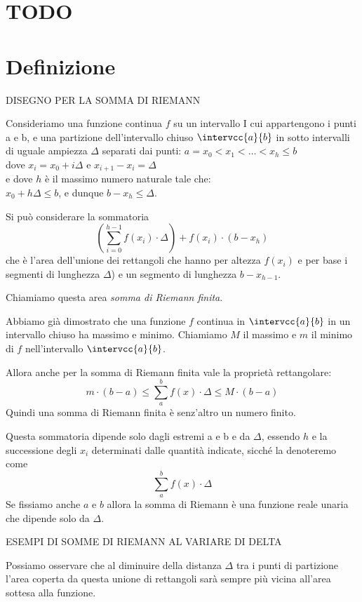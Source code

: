 \section{TODO}

\section{Definizione}
\label{sec:integrali_definizione}

DISEGNO PER LA SOMMA DI RIEMANN %

Consideriamo una funzione continua \(f\) su un intervallo I cui appartengono 
i punti a e b, e una partizione dell'intervallo chiuso \(\intervcc{a}{b}\) in 
sotto intervalli di uguale ampiezza \(\Delta\) 
separati dai punti: 
\(a = x_0 < x_1 < \dots < x_h \le b\) \\
dove \(x_i = x_0 +i \Delta\) e \(x_{i+1} - x_i= \Delta\) \\
e dove \(h\) è il massimo numero naturale tale che: \\
\(x_0 + h \Delta \le b\), e dunque \(b-x_h \le \Delta\).

Si può considerare la sommatoria
\[\left(\sum_{i=0}^{h-1} f(x_i)\cdot\Delta \right)+f(x_i)\cdot(b-x_h)\] 
che è l'area dell'unione dei rettangoli che 
hanno per altezza \(f(x_i)\) 
e per base i segmenti di lunghezza \(\Delta\)) e un segmento di lunghezza \(b 
- x_{h-1}\). 

Chiamiamo questa area \emph{somma di Riemann finita}.

Abbiamo già dimostrato che una funzione \(f\) continua in 
\(\intervcc{a}{b}\) in un intervallo chiuso ha massimo e minimo. 
Chiamiamo \(M\) il massimo e \(m\) il minimo di \(f\) nell'intervallo 
\(\intervcc{a}{b}\).

Allora anche per la somma di Riemann finita vale la proprietà rettangolare: 
\[m\cdot(b - a) \le \sum_a^b f(x) \cdot\Delta \le M\cdot(b - a)\] 
Quindi una somma di Riemann finita è senz'altro un numero finito.

Questa sommatoria dipende solo dagli estremi a e b 
e da \(\Delta\), essendo \(h\) e la successione degli \(x_i\) determinati 
dalle quantità indicate, sicché la denoteremo come 
\[\sum_a^b f(x) \cdot \Delta\] 
Se fissiamo anche \(a\) e \(b\) allora la somma di Riemann è una funzione 
reale unaria che dipende solo da \(\Delta\). 

ESEMPI DI SOMME DI RIEMANN AL VARIARE DI DELTA %

Possiamo osservare che al diminuire della distanza \(\Delta\) tra i punti di 
partizione l'area coperta da questa unione di rettangoli sarà sempre più 
vicina all'area sottesa alla funzione.

